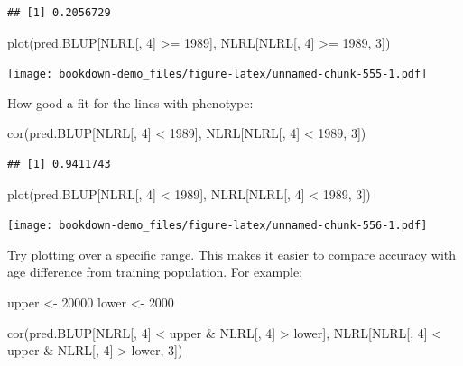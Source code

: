 \documentclass[
]{book}
\newenvironment{Shaded}{\begin{snugshade}}{\end{snugshade}}
\newcommand{\DecValTok}[1]{\textcolor[rgb]{0.00,0.00,0.81}{#1}}
\newcommand{\FunctionTok}[1]{\textcolor[rgb]{0.00,0.00,0.00}{#1}}
\newcommand{\NormalTok}[1]{#1}
\newcommand{\OtherTok}[1]{\textcolor[rgb]{0.56,0.35,0.01}{#1}}
\newcommand{\SpecialCharTok}[1]{\textcolor[rgb]{0.00,0.00,0.00}{#1}}
\begin{document}
\begin{verbatim}
## [1] 0.2056729
\end{verbatim}

\begin{Shaded}
\begin{Highlighting}[]
\FunctionTok{plot}\NormalTok{(pred.BLUP[NLRL[, }\DecValTok{4}\NormalTok{] }\SpecialCharTok{\textgreater{}=} \DecValTok{1989}\NormalTok{], NLRL[NLRL[, }\DecValTok{4}\NormalTok{] }\SpecialCharTok{\textgreater{}=} \DecValTok{1989}\NormalTok{, }\DecValTok{3}\NormalTok{])}
\end{Highlighting}
\end{Shaded}

\texttt{[image: bookdown-demo\_files/figure-latex/unnamed-chunk-555-1.pdf]}

How good a fit for the lines with phenotype:

\begin{Shaded}
\begin{Highlighting}[]
\FunctionTok{cor}\NormalTok{(pred.BLUP[NLRL[, }\DecValTok{4}\NormalTok{] }\SpecialCharTok{\textless{}} \DecValTok{1989}\NormalTok{], NLRL[NLRL[, }\DecValTok{4}\NormalTok{] }\SpecialCharTok{\textless{}} \DecValTok{1989}\NormalTok{, }\DecValTok{3}\NormalTok{])}
\end{Highlighting}
\end{Shaded}

\begin{verbatim}
## [1] 0.9411743
\end{verbatim}

\begin{Shaded}
\begin{Highlighting}[]
\FunctionTok{plot}\NormalTok{(pred.BLUP[NLRL[, }\DecValTok{4}\NormalTok{] }\SpecialCharTok{\textless{}} \DecValTok{1989}\NormalTok{], NLRL[NLRL[, }\DecValTok{4}\NormalTok{] }\SpecialCharTok{\textless{}} \DecValTok{1989}\NormalTok{, }\DecValTok{3}\NormalTok{])}
\end{Highlighting}
\end{Shaded}

\texttt{[image: bookdown-demo\_files/figure-latex/unnamed-chunk-556-1.pdf]}

Try plotting over a specific range. This makes it easier to compare accuracy with age
difference from training population. For example:

\begin{Shaded}
\begin{Highlighting}[]
\NormalTok{upper }\OtherTok{\textless{}{-}} \DecValTok{20000}
\NormalTok{lower }\OtherTok{\textless{}{-}} \DecValTok{2000}

\FunctionTok{cor}\NormalTok{(pred.BLUP[NLRL[, }\DecValTok{4}\NormalTok{] }\SpecialCharTok{\textless{}}\NormalTok{ upper }\SpecialCharTok{\&}\NormalTok{ NLRL[, }\DecValTok{4}\NormalTok{] }\SpecialCharTok{\textgreater{}}\NormalTok{ lower], NLRL[NLRL[, }
    \DecValTok{4}\NormalTok{] }\SpecialCharTok{\textless{}}\NormalTok{ upper }\SpecialCharTok{\&}\NormalTok{ NLRL[, }\DecValTok{4}\NormalTok{] }\SpecialCharTok{\textgreater{}}\NormalTok{ lower, }\DecValTok{3}\NormalTok{])}
\end{Highlighting}
\end{Shaded}
\end{document}
